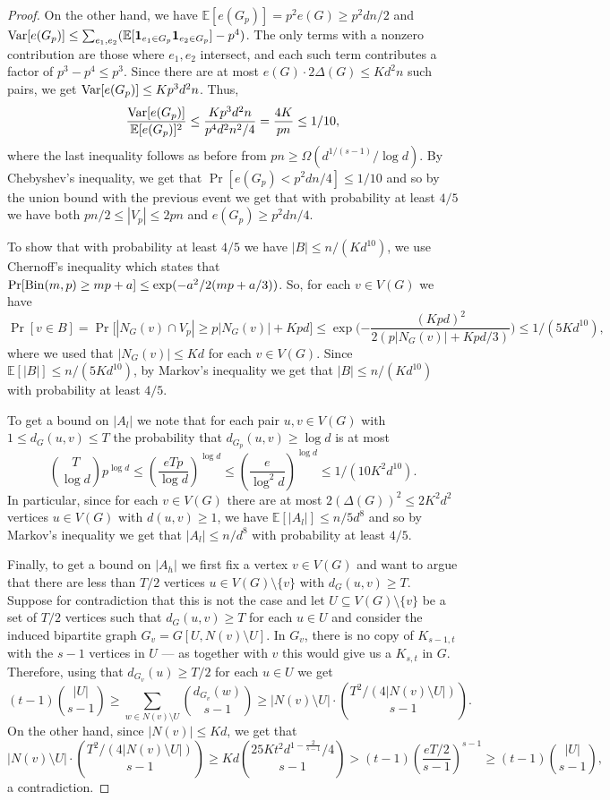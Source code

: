 \documentclass[10pt, a4paper]{article}
\numberwithin{theorem}{section} %
\theoremstyle{remark}
\theoremstyle{definition}
\newcommand{\bE}{\mathbb{E}}
\begin{document}
\begin{proof}
    On the other hand, we have $\bE[e(G_p)]=p^2e(G)\geq p^2dn/2$ and ${\rm Var}[e(G_p)]\leq \sum_{e_1, e_2}(\bE[\mathbf{1}_{e_1\in G_p}\mathbf{1}_{e_2\in G_p}]-p^4)$. The only terms with a nonzero contribution are those where $e_1, e_2$ intersect, and each such term contributes a factor of $p^3-p^4\leq p^3$. Since there are at most $e(G)\cdot 2\Delta(G) \leq Kd^2n$ such pairs, we get ${\rm Var}[e(G_p)] \leq Kp^3d^2n$. Thus, 
    \[    \frac{{\rm Var}[e(G_p)]}{\bE[e(G_p)]^2} \leq \frac{Kp^3d^2n}{p^4d^2n^2/4} = \frac{4K}{pn} \leq 1/10,\]
    where the last inequality follows as before from $pn\geq \Omega(d^{1/(s-1)}/\log d)$. By Chebyshev's inequality, we get that $\Pr[e(G_p) < p^2dn/4] \leq 1/10$ and so by the union bound with the previous event we get that with probability at least $4/5$ we have both $pn/2 \leq |V_p| \leq 2pn$ and $e(G_p) \geq p^2dn/4$.
    
    To show that with probability at least $4/5$ we have $|B| \leq n/(Kd^{10})$, we use Chernoff's inequality which states that $\Pr[{\rm Bin}(m, p)\geq mp+a]\leq \exp(-a^2/2(mp+a/3))$. So, for each $v\in V(G)$ we have
    \[
        \Pr[v \in B] = \Pr\big[|N_{G}(v)\cap V_p| \geq p|N_G(v)|+Kpd\big] \leq \exp\Big({-\frac{(Kpd)^2}{2(p|N_G(v)|+Kpd/3)}}\Big)\leq 1/(5Kd^{10}),
    \]
    where we used that $|N_G(v)| \leq Kd$ for each $v \in V(G)$. Since $\bE[|B|] \leq n/(5Kd^{10})$, by Markov's inequality we get that $|B| \leq n/(Kd^{10})$ with probability at least $4/5$.

    To get a bound on $|A_l|$ we note that for each pair $u,v \in V(G)$ with $1 \leq d_G(u, v) \leq T$ the probability that $d_{G_p}(u, v) \geq \log d$ is at most
    \[
        \binom{T}{\log d} p^{\log d} \leq \left(\frac{eTp}{\log d}\right)^{\log d} \leq \left( \frac{e}{\log^2d} \right)^{\log d} \leq 1/(10K^2d^{10}).
    \]
    In particular, since for each $v \in V(G)$ there are at most $2(\Delta(G))^2 \leq 2K^2d^2$ vertices $u \in V(G)$ with $d(u, v) \geq 1$, we have $\mathbb{E}[|A_{l}|] \leq n / 5d^{8}$ and so by Markov's inequality we get that $|A_l| \leq n/d^8$ with probability at least $4/5$.

    Finally, to get a bound on $|A_h|$ we first fix a vertex $v \in V(G)$ and want to argue that there are less than $T/2$ vertices $u \in V(G) \setminus\{v\}$ with $d_G(u, v) \geq T$.
    Suppose for contradiction that this is not the case and let $U \subseteq V(G) \setminus \{v\}$ be a set of $T/2$ vertices such that $d_G(u,v) \geq T$ for each $u \in U$ and consider the induced bipartite graph $G_v = G[U, N(v) \setminus U]$.
    In $G_v$, there is no copy of $K_{s-1, t}$ with the $s-1$ vertices in $U$ --- as together with $v$ this would give us a $K_{s, t}$ in $G$.
    Therefore, using that $d_{G_v}(u) \geq T/2$ for each $u \in U$ we get
    \[  
        (t-1)\binom{|U|}{s-1} \geq \sum_{w \in N(v) \setminus U} \binom{d_{G_v}(w)}{s-1} \geq |N(v) \setminus U| \cdot \binom{T^2/(4|N(v) \setminus U| )}{s-1}.
    \]
    On the other hand, since $|N(v)| \leq Kd$, we get that
    \[
        |N(v) \setminus U| \cdot \binom{T^2/(4|N(v) \setminus U| )}{s-1} \geq Kd\binom{25Kt^2d^{1-\frac{2}{s-1}}/4}{s-1} > (t-1)\left( \frac{e T/2}{s-1} \right)^{s-1}\geq (t-1)\binom{|U|}{s-1},
    \]
    a contradiction.
    

\end{proof}
\end{document}
